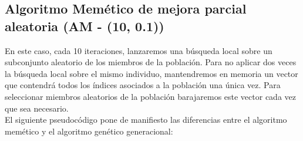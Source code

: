 \documentclass[11pt,a4paper]{article}
\begin{document}
		\subsection{Algoritmo Memético de mejora parcial aleatoria (AM - (10, 0.1))}
		
		\noindent En este caso, cada 10 iteraciones, lanzaremos una búsqueda local sobre un subconjunto aleatorio de los miembros de la población. Para no aplicar dos veces la búsqueda local sobre el mismo individuo, mantendremos en memoria un vector que contendrá todos los índices asociados a la población una única vez. Para seleccionar miembros aleatorios de la población barajaremos este vector cada vez que sea necesario.\\
		
		\noindent El siguiente pseudocódigo pone de manifiesto las diferencias entre el algoritmo memético y el algoritmo genético generacional:\\
		
\end{document}
